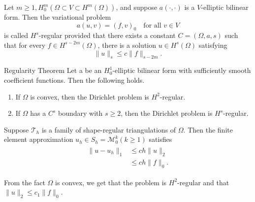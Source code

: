 \begin{defn}
    Let $m\geq 1, H^m_0(\Omega\subset V\subset H^m(\Omega))$, and suppose $a(\cdot,\cdot)$ is a $V$-elliptic bilinear form. 
    Then the variational problem
    \begin{equation}
        a(u,v) = (f,v)_0\quad \text{for all } v\in V
    \end{equation}
    is called $H^s$-regular provided that there exists a constant $C=(\Omega,a,s)$ such that for every  $f\in H^{s-2m}(\Omega)$,
    there is a solution $u\in H^s(\Omega)$ satisfying
    \begin{equation}
        \|u\|_s\leq c\|f\|_{s-2m}.
    \end{equation}
    \label{defn:7.1}
\end{defn}

\begin{thmx}{Regularity Theorem}
    Let a be an $H^1_0$-elliptic bilinear form with sufficiently smooth coefficient functions. Then the following holds. 
    \begin{enumerate}
        \item If $\Omega$ is convex, then the Dirichlet problem is $H^2$-regular. 
        \item If $\Omega$ has a $C^s$ boundary with $s\geq 2$, then the Dirichlet problem is $H^s$-regular.
    \end{enumerate}
\end{thmx}

\begin{thmx}{\quad}
    Suppose $\mathcal{T}_h$ is a family of shape-regular triangulations of $\Omega$. Then the finite element approximation $u_h\in S_h = \mathcal{M}^k_0(k\geq 1)$ satisfies
    \begin{align}
        \begin{split}
            \|u-u_h\|_1&\leq ch\|u\|_2\ \\
            &\leq ch\|f\|_0.
        \end{split}
    \end{align}
\end{thmx}
\begin{bev}
    From the fact $\Omega$ is convex, we get that the problem is $H^2$-regular and that $\|u\|_2 \leq c_1\|f\|_0$.

\end{bev}